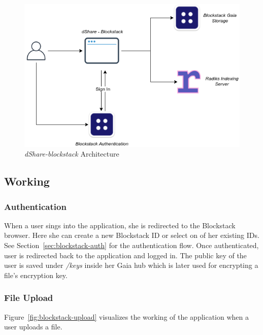 			\begin{figure}[h]
				\includegraphics[width=\linewidth]{figures/dshare-blockstack}
				\caption{\label{fig:dshare-blockstack} \textit{dShare-blockstack} Architecture}
			\end{figure}
		
		\subsection{Working}
		
			\subsubsection{Authentication}
			When a user sings into the application, she is redirected to the Blockstack browser. Here she can create a new Blockstack ID or select on of her existing IDs. See Section~\ref{sec:blockstack-auth} for the authentication flow. Once authenticated, user is redirected back to the application and logged in. The public key of the user is saved under \textit{/keys} inside her Gaia hub which is later used for encrypting a file's encryption key.
			
			\subsubsection{File Upload}
			Figure~\ref{fig:blockstack-upload} visualizes the working of the application when a user uploads a file.
			
